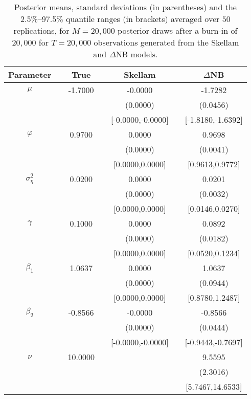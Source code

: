\begin{table} 
\center 
\begin{tabular}{c cc cc cc} 
\toprule 
Parameter && True  && Skellam && $\Delta$NB \\ \hline  \hline
$\mu$   &&  -1.7000  &&  -0.0000  &&  -1.7282  \\  
 &&   &&  (0.0000)  &&  (0.0456)  \\  
 &&   &&  [-0.0000,-0.0000]  &&  [-1.8180,-1.6392]  \\ [1ex] 
$\varphi$   &&  0.9700  &&  0.0000  &&  0.9698  \\  
 &&   &&  (0.0000)  &&  (0.0041)  \\  
 &&   &&  [0.0000,0.0000]  &&  [0.9613,0.9772]  \\ [1ex] 
$\sigma^2_{\eta}$   &&  0.0200  &&  0.0000  &&  0.0201  \\  
 &&   &&  (0.0000)  &&  (0.0032)  \\  
 &&   &&  [0.0000,0.0000]  &&  [0.0146,0.0270]  \\ [1ex] 
$\gamma$   &&  0.1000  &&  0.0000  &&  0.0892  \\  
 &&   &&  (0.0000)  &&  (0.0182)  \\  
 &&   &&  [0.0000,0.0000]  &&  [0.0520,0.1234]  \\ [1ex] 
$\beta_1$   &&      1.0637   &&  0.0000  &&  1.0637  \\  
 &&   &&  (0.0000)  &&  (0.0944)  \\  
 &&   &&  [0.0000,0.0000]  &&  [0.8780,1.2487]  \\ [1ex] 
$\beta_2$   &&      -0.8566    &&  -0.0000  &&  -0.8566  \\  
 &&   &&  (0.0000)  &&  (0.0444)  \\  
 &&   &&  [-0.0000,-0.0000]  &&  [-0.9443,-0.7697]  \\ [1ex] 
$\nu$   &&  10.0000  &&    &&  9.5595  \\  
 &&   &&    &&  (2.3016)  \\  
 &&   &&   &&  [5.7467,14.6533]  \\ [1ex] 
\bottomrule
\end{tabular}
 \caption{Posterior means, standard deviations (in parentheses) 
and the 2.5\%--97.5\% quantile ranges (in brackets) averaged over $50$ replications, 
 for $M=20,000$ posterior draws after a burn-in of $20,000$ 
for $T=20,000$ observations  generated from the Skellam and $\Delta$NB models.}
\label{tab:sim_res} 
\end{table}
